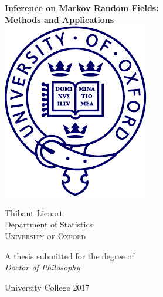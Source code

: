 \begin{titlepage}
\begin{center}

\vspace*{1.2cm}

{\Huge{\bfseries Inference on Markov Random Fields:\\[.1cm] Methods and Applications}\\}
\vfill 
\vspace*{-.3cm}
\includegraphics[scale=.8]{figures/oxlogo}
\vspace*{-.9cm}
\vfill

{\Large Thibaut Lienart}\\[1.2cm]

{\large 
   	{Department of Statistics}}\\[0.3cm]
{\large 
   	{\textsc{University of Oxford}}}
	
\vspace*{-.4cm}
\vfill

{\large A thesis submitted for the degree of}\\[.3cm]

{\large \emph{Doctor of Philosophy}}\\[.3cm]
\end{center}
\vfill
{\large University College \hfill {} 2017}
\end{titlepage}